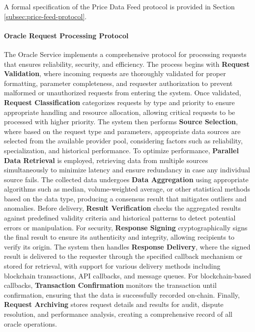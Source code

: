 \documentclass{article}
\begin{document}
A formal specification of the Price Data Feed protocol is provided in Section \ref{subsec:price-feed-protocol}.



\paragraph{Oracle Request Processing Protocol}
The Oracle Service implements a comprehensive protocol for processing requests that ensures reliability, security, and efficiency. The process begins with \textbf{Request Validation}, where incoming requests are thoroughly validated for proper formatting, parameter completeness, and requester authorization to prevent malformed or unauthorized requests from entering the system. Once validated, \textbf{Request Classification} categorizes requests by type and priority to ensure appropriate handling and resource allocation, allowing critical requests to be processed with higher priority. The system then performs \textbf{Source Selection}, where based on the request type and parameters, appropriate data sources are selected from the available provider pool, considering factors such as reliability, specialization, and historical performance. To optimize performance, \textbf{Parallel Data Retrieval} is employed, retrieving data from multiple sources simultaneously to minimize latency and ensure redundancy in case any individual source fails. The collected data undergoes \textbf{Data Aggregation} using appropriate algorithms such as median, volume-weighted average, or other statistical methods based on the data type, producing a consensus result that mitigates outliers and anomalies. Before delivery, \textbf{Result Verification} checks the aggregated results against predefined validity criteria and historical patterns to detect potential errors or manipulation. For security, \textbf{Response Signing} cryptographically signs the final result to ensure its authenticity and integrity, allowing recipients to verify its origin. The system then handles \textbf{Response Delivery}, where the signed result is delivered to the requester through the specified callback mechanism or stored for retrieval, with support for various delivery methods including blockchain transactions, API callbacks, and message queues. For blockchain-based callbacks, \textbf{Transaction Confirmation} monitors the transaction until confirmation, ensuring that the data is successfully recorded on-chain. Finally, \textbf{Request Archiving} stores request details and results for audit, dispute resolution, and performance analysis, creating a comprehensive record of all oracle operations.
\end{document}
